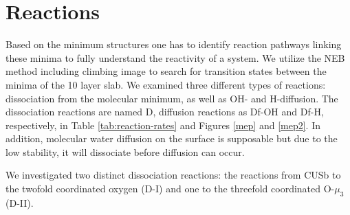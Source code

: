 \documentclass[11pt,DIV=13,BCOR=5mm,a4paper,headinclude]{scrbook}
\begin{document}
\section{Reactions}\label{reactions}

Based on the minimum structures one has to identify reaction pathways linking these minima to fully understand the reactivity of a system.
We utilize the NEB method including climbing image to search for transition states between the minima of the 10 layer slab.
We examined three different types of reactions: dissociation from the molecular minimum, as well as OH- and H-diffusion.
The dissociation reactions are named D, diffusion reactions as Df-OH and Df-H, respectively, in Table \ref{tab:reaction-rates} and Figures \ref{mep} and \ref{mep2}.
In addition, molecular water diffusion on the surface is supposable but due to the low stability, it will dissociate before diffusion can occur.


We investigated two distinct dissociation reactions: the reactions from CUSb to the twofold coordinated oxygen (D-I) and one to the threefold coordinated O-$\mu_3$ (D-II).
\end{document}
